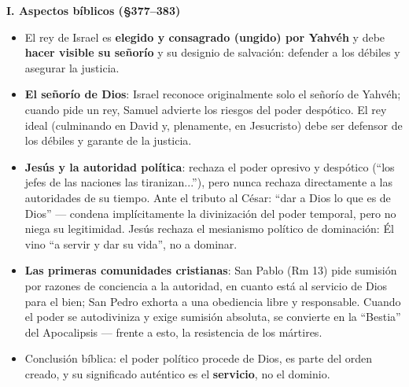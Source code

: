 \documentclass[10pt,a4paper]{article}
\begin{document}
\medskip\noindent \textbf{I. Aspectos bíblicos (\S{}377--383)}\par\nopagebreak
\begin{itemize}
\item El rey de Israel es \textbf{elegido y consagrado (ungido) por Yahvéh} y debe \textbf{hacer visible su señorío} y su designio de salvación: defender a los débiles y asegurar la justicia.
\item \textbf{El señorío de Dios}: Israel reconoce originalmente solo el señorío de Yahvéh; cuando pide un rey, Samuel advierte los riesgos del poder despótico. El rey ideal (culminando en David y, plenamente, en Jesucristo) debe ser defensor de los débiles y garante de la justicia.
\item \textbf{Jesús y la autoridad política}: rechaza el poder opresivo y despótico (``los jefes de las naciones las tiranizan...''), pero nunca rechaza directamente a las autoridades de su tiempo. Ante el tributo al César: ``dar a Dios lo que es de Dios'' --- condena implícitamente la divinización del poder temporal, pero no niega su legitimidad. Jesús rechaza el mesianismo político de dominación: Él vino ``a servir y dar su vida'', no a dominar.
\item \textbf{Las primeras comunidades cristianas}: San Pablo (Rm 13) pide sumisión por razones de conciencia a la autoridad, en cuanto está al servicio de Dios para el bien; San Pedro exhorta a una obediencia libre y responsable. Cuando el poder se autodiviniza y exige sumisión absoluta, se convierte en la ``Bestia'' del Apocalipsis --- frente a esto, la resistencia de los mártires.
\item Conclusión bíblica: el poder político procede de Dios, es parte del orden creado, y su significado auténtico es el \textbf{servicio}, no el dominio.
\end{itemize}
\end{document}
